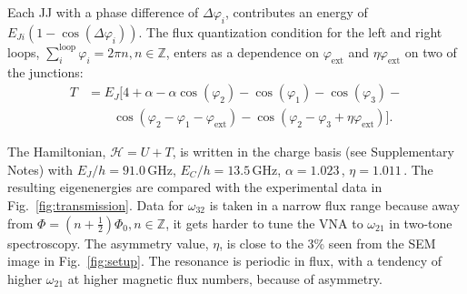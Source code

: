 \documentclass[%
reprint,
superscriptaddress,
bibnotes,
amsmath,
amssymb,
aps,
showkeys,
prb,
]{revtex4-2}
\newcommand{\iunit}[2]{\ensuremath{#1\,\text{#2}}}
\begin{document}
Each  JJ  with  a  phase  difference  of  $\Delta\varphi_{i}$,  contributes  an  energy  of
$ E_{Ji}\left(1 - \cos(\Delta\varphi_i)\right) $.   The flux quantization condition for the
left                     and                    right                     loops,
$ \sum_{i}^{\text{loop}}  \varphi_i = 2\pi  n, n \in \mathbb{Z}$,  enters as a  dependence on
$ \varphi_\text{ext} $ and $ \eta\varphi_\text{ext} $ on two of the junctions:
\begin{equation}\label{eq:kinetic}
  \begin{aligned}
    T & = E_J\big[4 + \alpha - \alpha\cos(\varphi_{2}) -\cos(\varphi_{1}) -\cos(\varphi_{3}) - \\
    &  \qquad  \cos(\varphi_{2}   -  \varphi_{1}  -  \varphi_{\text{ext}})  -  \cos(\varphi_{2}   -  \varphi_{3}  +
    \eta\varphi_{\text{ext}})\big].
  \end{aligned}
\end{equation}

The  Hamiltonian, $\mathcal{H}= U + T$, is  written  in  the charge  basis (see  Supplementary Notes)  with
\iunit{E_J/h = 91.0}{GHz}, \iunit{E_C/h = 13.5}{GHz}, \iunit{\alpha = 1.023}{}, \iunit{\eta
  = 1.011}{}. The resulting eigenenergies are compared with the experimental data in
Fig.~\ref{fig:transmission}.  Data for $ \omega_{32} $ is taken in a narrow flux range
because away from $ \Phi = (n + \frac{1}{2}) \Phi_0, n\in\mathbb{Z} $, it gets harder to tune the VNA to
$ \omega_{21} $  in two-tone spectroscopy.  The  asymmetry value, $ \eta $,  is close to
the  3\%  seen  from  the   SEM  image  in
Fig.~\ref{fig:setup}.  The  resonance is  periodic in flux,  with a  tendency of
higher $\omega_{21}$ at higher magnetic flux numbers, because of asymmetry.
\end{document}
